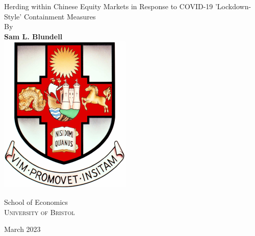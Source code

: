 \begin{titlepage}
    \begin{center}
        \vspace*{1cm}
        {\huge
        Herding within Chinese Equity Markets in Response to COVID-19
’Lockdown-Style’ Containment Measures}
        \vspace{0.5cm}
        \\
        {\large By}
        \\
        \vspace{0.5cm}
        \textbf{Sam L. Blundell}
   		\vspace{1.5cm}
        \\
        \vspace{1.5cm}
       \includegraphics[scale=1]{TeX_files/bristolcrest_colour.pdf}
    
        \vspace{10mm}
        \large{School of Economics}
        \\
        \textsc{University of Bristol}

        \vspace{0.8cm}

        \large{March 2023}
        
    \end{center}
    
 

\end{titlepage}